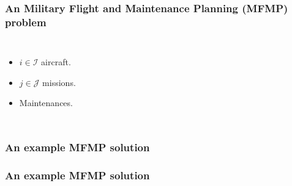 \begin{frame}
\frametitle{\textbf{An Military Flight and Maintenance Planning (MFMP) problem}}

  \begin{columns}[c]

    \pause
    \begin{itemize}[<+->]
      \item $i \in \mathcal{I}$ aircraft.
      \item $j \in \mathcal{J}$ missions.
      \item Maintenances.
    \end{itemize}

  \end{columns}

\end{frame}

\begin{frame}
\frametitle{\textbf{An example MFMP solution}}
  
\end{frame}

\begin{frame}
\frametitle{\textbf{An example MFMP solution}}
  
\end{frame}

